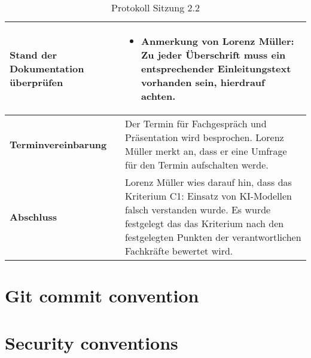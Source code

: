 \newpage

\begin{table}[H]
    \begin{tabular}{|L{0.3\textwidth}|L{0.7\textwidth}|}
        \hline
        \textbf{Stand der Dokumentation überprüfen} & 
        \begin{itemize}
            \item Anmerkung von Lorenz Müller: Zu jeder Überschrift muss ein entsprechender Einleitungstext vorhanden sein, hierdrauf achten.
        \end{itemize}
        \\
        \hline
        \textbf{Terminvereinbarung} & Der Termin für Fachgespräch und Präsentation wird besprochen. Lorenz Müller merkt an, dass er eine Umfrage für den Termin aufschalten werde. \\
        \hline
        \textbf{Abschluss} & Lorenz Müller wies darauf hin, dass das Kriterium C1: Einsatz von KI-Modellen falsch verstanden wurde. Es wurde festgelegt das 
        das Kriterium nach den festgelegten Punkten der verantwortlichen Fachkräfte bewertet wird.   \\
        \hline
    \end{tabular}
    \caption{Protokoll Sitzung 2.2}
\end{table}

\section{Git commit convention}
\section{Security conventions}





